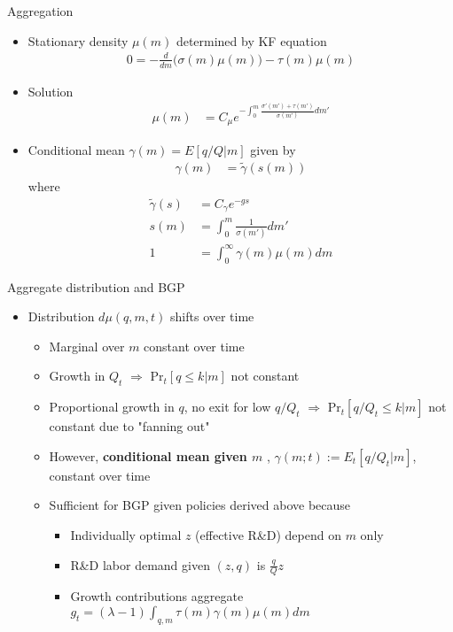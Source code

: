 \documentclass[english,usenames,dvipsnames]{beamer}
\begin{document}
\begin{frame}{Aggregation}\label{aggregation}
\hyperlink{closing_the_model}{}
\begin{itemize}
\item Stationary density $\mu(m)$ determined by KF equation
\begin{align*}
0 = - \frac{d}{dm} \Big( \sigma(m) \mu(m) \Big) - \tau(m) \mu(m)
\end{align*}
\item Solution
\begin{align*}
\mu(m) &= C_\mu e^{-\int_0^m \frac{\sigma'(m') + \tau(m')}{\sigma(m')}dm'} 
\end{align*}
\item Conditional mean $\gamma(m) = E[q/Q | m]$ given by 
\begin{align*}
\gamma(m) &= \tilde{\gamma}(s(m))
\end{align*}
where
\begin{align*}
\tilde{\gamma}(s) &= C_{\gamma} e^{-gs} \\
s(m) &= \int_0^m \frac{1}{\sigma(m')} dm' \\
1 &= \int_0^{\infty} \gamma(m) \mu(m) dm
\end{align*}
\end{itemize}
\end{frame}




\begin{frame}{Aggregate distribution and BGP}\label{aggregate_distribution_and_bgp}
\hyperlink{closing_the_model}{}
\begin{itemize}
	\item Distribution $d\mu(q,m,t)$ shifts over time
	\begin{itemize}
		\item Marginal over $m$ constant over time
		\item Growth in $Q_t$ $\Rightarrow$ $\textrm{Pr}_t[q \le k | m]$ not constant
		\item Proportional growth in $q$, no exit for low $q/Q_t$ $\Rightarrow$ $\textrm{Pr}_t[q /Q_t\le k | m]$ not constant due to "fanning out"
		\item However, \textbf{\alert{conditional mean given $m$}} , $\gamma(m;t) := E_t[q/Q_t | m]$, constant over time
		\item Sufficient for BGP given policies derived above because
		\begin{itemize}
			\item Individually optimal $z$ (effective R\&D) depend on $m$ only
			\item R\&D labor demand given $(z,q)$ is $\frac{q}{Q}z$
			\item Growth contributions aggregate $g_t = (\lambda -1)\int_{q,m} \tau(m) \gamma(m) \mu(m) dm$
		\end{itemize}
	\end{itemize}
\end{itemize}
\end{frame}
\end{document}
